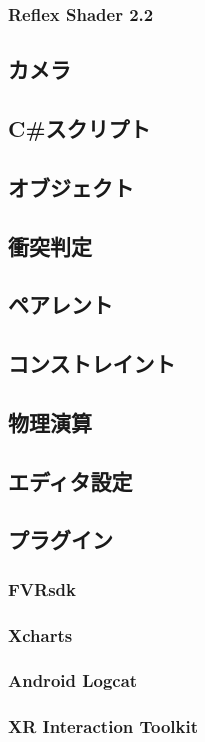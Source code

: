 \documentclass[report]{ltjsbook}
\begin{document}
			\subsubsection{Reflex Shader 2.2}
		\subsection{カメラ}
		\subsection{C\#スクリプト}
		\subsection{オブジェクト}
		\subsection{衝突判定}
		\subsection{ペアレント}
		\subsection{コンストレイント}
\clearpage
		\subsection{物理演算}
		\subsection{エディタ設定}
		\subsection{プラグイン}
			\subsubsection{FVRsdk}
			\subsubsection{Xcharts}
			\subsubsection{Android Logcat}
			\subsubsection{XR Interaction Toolkit}
\end{document}
